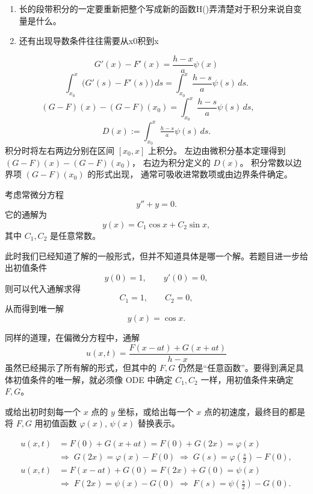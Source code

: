\begin{dxtips}[计算技巧]
   \begin{enumerate}
       \item 长的段带积分的一定要重新把整个写成新的函数H()弄清楚对于积分来说自变量是什么。
       \item  还有出现导数条件往往需要从x0积到x
   \end{enumerate}
\begin{dxsolution}
\[
G'(x)-F'(x)=\frac{h-x}{a}\psi(x)
\]
\[
\int_{x_0}^{x}\!\!\bigl(G'(s)-F'(s)\bigr)\,ds
=\int_{x_0}^{x}\!\!\frac{h-s}{a}\psi(s)\,ds.
\]
\[
(G-F)(x)-(G-F)(x_0)
=\int_{x_0}^{x}\!\!\frac{h-s}{a}\psi(s)\,ds,
\qquad\]
\[D(x):=\int_{x_0}^{x}\tfrac{h-s}{a}\psi(s)\,ds.
\]
\tcblower
积分时将左右两边分别在区间 $[x_0,x]$ 上积分。  
左边由微积分基本定理得到 $(G-F)(x)-(G-F)(x_0)$，  
右边为积分定义的 $D(x)$。  
积分常数以边界项 $(G-F)(x_0)$ 的形式出现，  
通常可吸收进常数项或由边界条件确定。
\end{dxsolution}
   
\end{dxtips}
\begin{example}
考虑常微分方程
\[
y''+y=0.
\]
它的通解为
\[
y(x)=C_1 \cos x + C_2 \sin x,
\]
其中 $C_1,C_2$ 是任意常数。

此时我们已经知道了解的一般形式，但并不知道具体是哪一个解。若题目进一步给出初值条件
\[
y(0)=1,\qquad y'(0)=0,
\]
则可以代入通解求得
\[
C_1=1,\qquad C_2=0,
\]
从而得到唯一解
\[
y(x)=\cos x.
\]

同样的道理，在偏微分方程中，通解
\[
u(x,t)=\frac{F(x-at)+G(x+at)}{h-x}
\]
虽然已经揭示了所有解的形式，但其中的 $F,G$ 仍然是“任意函数”。要得到满足具体初值条件的唯一解，就必须像 ODE 中确定 $C_1,C_2$ 一样，用初值条件来确定 $F,G$。
\end{example}
\begin{dxtips}[条件是干什么都]
   或给出初时刻每一个 $x$ 点的 $y$ 坐标，或给出每一个 $x$ 点的初速度，最终目的都是将 $F,G$ 用初值函数 $\varphi(x),\,\psi(x)$ 替换表示。
\begin{example}
\begin{align*}
u(x,t)&=F(0)+G(x+at)=F(0)+G(2x)=\varphi(x)
\\[2pt]
&\Longrightarrow\;
G(2x)=\varphi(x)-F(0)
\;\Rightarrow\;
G(s)=\varphi\!\left(\tfrac{s}{2}\right)-F(0),
\\[6pt]
u(x,t)&=F(x-at)+G(0)=F(2x)+G(0)=\psi(x)
\\[2pt]
&\Longrightarrow\;
F(2x)=\psi(x)-G(0)
\;\Rightarrow\;
F(s)=\psi\!\left(\tfrac{s}{2}\right)-G(0).
\end{align*}
\end{example}
\end{dxtips}
